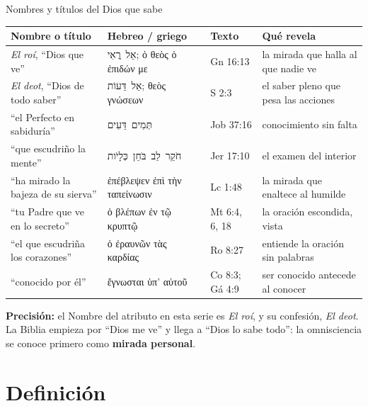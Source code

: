 \documentclass[hyperref={bookmarks=false},aspectratio=169]{beamer}
\newcommand{\heb}[1]{\mbox{\foreignlanguage{hebrew}{#1}}}
\newcommand{\grc}[1]{\foreignlanguage{ancientgreek}{#1}}
\newcommand{\destacar}[1]{\textbf{\textcolor{azul}{#1}}}
\newcommand{\precision}[1]{{\footnotesize\color{gris}\textbf{Precisión:} #1}}
\begin{document}
\begin{frame}{Nombres y títulos del Dios que sabe}
\scriptsize\renewcommand{\arraystretch}{1.08}
\begin{tabular}{@{}>{\RaggedRight\arraybackslash}p{3.0cm}>{\RaggedRight\arraybackslash}p{3.6cm}>{\RaggedRight\arraybackslash}p{1.9cm}>{\RaggedRight\arraybackslash}p{3.2cm}@{}}
\toprule
\textbf{Nombre o título} & \textbf{Hebreo / griego} & \textbf{Texto} & \textbf{Qué revela} \\ \midrule
\emph{El roí}, ``Dios que ve'' & \heb{אֵל רֳאִי}; \grc{ὁ θεὸς ὁ ἐπιδών με} & Gn 16:13 & la mirada que halla al que nadie ve \\
\emph{El deot}, ``Dios de todo saber'' & \heb{אֵל דֵּעוֹת}; \grc{θεὸς γνώσεων} & 1 S 2:3 & el saber pleno que pesa las acciones \\
``el Perfecto en sabiduría'' & \heb{תְּמִים דֵּעִים} & Job 37:16 & conocimiento sin falta \\
``que escudriño la mente'' & \heb{חֹקֵר לֵב בֹּחֵן כְּלָיֹות} & Jer 17:10 & el examen del interior \\
``ha mirado la bajeza de su sierva'' & \grc{ἐπέβλεψεν ἐπὶ τὴν ταπείνωσιν} & Lc 1:48 & la mirada que enaltece al humilde \\
``tu Padre que ve en lo secreto'' & \grc{ὁ βλέπων ἐν τῷ κρυπτῷ} & Mt 6:4, 6, 18 & la oración escondida, vista \\
``el que escudriña los corazones'' & \grc{ὁ ἐραυνῶν τὰς καρδίας} & Ro 8:27 & entiende la oración sin palabras \\
``conocido por él'' & \grc{ἔγνωσται ὑπ’ αὐτοῦ} & 1 Co 8:3; Gá 4:9 & ser conocido antecede al conocer \\
\bottomrule
\end{tabular}\par\smallskip
\precision{el Nombre del atributo en esta serie es \emph{El roí}, y su confesión, \emph{El deot}. La Biblia empieza por ``Dios me ve'' y llega a ``Dios lo sabe todo'': la omnisciencia se conoce primero como \destacar{mirada personal}.}
\end{frame}

\section{Definición}
\end{document}

